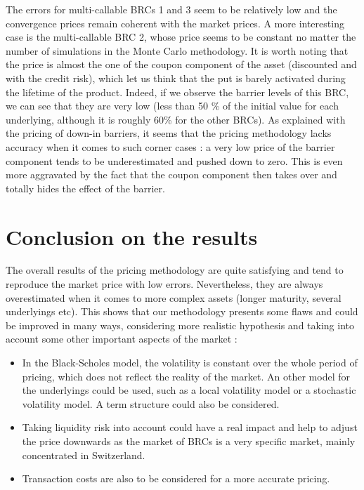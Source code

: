 \documentclass[a4paper,11pt,english]{book}
\begin{document}
The errors for multi-callable BRCs 1 and 3 seem to be relatively low and the convergence prices remain coherent with the market prices. A more interesting case is the multi-callable BRC 2, whose price seems to be constant no matter the number of simulations in the Monte Carlo methodology. It is worth noting that the price is almost the one of the coupon component of the asset (discounted and with the credit risk), which let us think that the put is barely activated during the lifetime of the product. Indeed, if we observe the barrier levels of this BRC, we can see that they are very low (less than 50 \% of the initial value for each underlying, although it is roughly 60\% for the other BRCs). As explained with the pricing of down-in barriers, it seems that the pricing methodology lacks accuracy when it comes to such corner cases : a very low price of the barrier component tends to be underestimated and pushed down to zero. This is even more aggravated by the fact that the coupon component then takes over and totally hides the effect of the barrier.

\section{Conclusion on the results}
The overall results of the pricing methodology are quite satisfying and tend to reproduce the market price with low errors. Nevertheless, they are always overestimated when it comes to more complex assets (longer maturity, several underlyings etc). This shows that our methodology presents some flaws and could be improved in many ways, considering more realistic hypothesis and taking into account some other important aspects of the market :
\begin{itemize}
    \item In the Black-Scholes model, the volatility is constant over the whole period of pricing, which does not reflect the reality of the market. An other model for the underlyings could be used, such as a local volatility model or a stochastic volatility model. A term structure could also be considered.
    \item Taking liquidity risk into account could have a real impact and help to adjust the price downwards as the market of BRCs is a very specific market, mainly concentrated in Switzerland.
    \item Transaction costs are also to be considered for a more accurate pricing.
\end{itemize}
\end{document}
